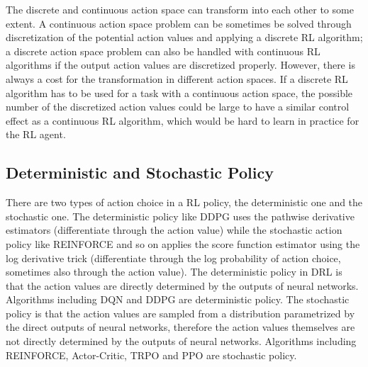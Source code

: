 \documentclass{article}
\begin{document}
The discrete and continuous action space can transform into each other to some extent. A continuous action space problem can be sometimes be solved through discretization of the potential action values and applying a discrete RL algorithm; a discrete action space problem can also be handled with continuous RL algorithms if the output action values are discretized properly. However, there is always a cost for the transformation in different action spaces. If a discrete RL algorithm has to be used for a task with a continuous action space, the possible number of the discretized action values could be large to have a similar control effect as a continuous RL algorithm, which would be hard to learn in practice for the RL agent.

\subsection{Deterministic and Stochastic Policy}
There are two types of action choice in a RL policy, the deterministic one and the stochastic one. The deterministic policy like DDPG uses the pathwise derivative estimators (differentiate through the action value) while the stochastic action policy like REINFORCE and so on applies the score function estimator using the log derivative trick (differentiate through the log probability of action choice, sometimes also through the action value).  The deterministic policy in DRL is that the action values are directly determined by the outputs of neural networks. Algorithms including DQN and DDPG are deterministic policy. The stochastic policy is that the action values are sampled from a distribution parametrized by the direct outputs of neural networks, therefore the action values themselves are not directly determined by the outputs of neural networks. Algorithms including REINFORCE, Actor-Critic, TRPO and PPO are stochastic policy.
\end{document}

